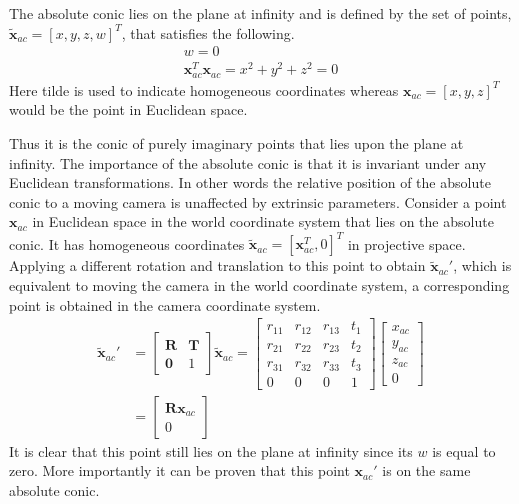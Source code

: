 The absolute conic lies on the plane at infinity and is defined by the set of points, $\tilde{\bm{x}}_{ac} = [x, y, z, w]^T$, that satisfies the following. 
\begin{align}
	w = 0 \\
	\bm{x}_{ac}^T \bm{x}_{ac}=x^2 + y^2 + z^2 = 0 
	\label{eq:conditions of absolute conic}
\end{align}
Here tilde is used to indicate homogeneous coordinates whereas $\bm{x}_{ac} = [x, y, z]^T$ would be the point in Euclidean space.

Thus it is the conic of purely imaginary points that lies upon the plane at infinity. The importance of the absolute conic is that it is invariant under any Euclidean transformations. In other words the relative position of the absolute conic to a moving camera is unaffected by extrinsic parameters. Consider a point $\bm{x}_{ac}$ in Euclidean space in the world coordinate system that lies on the absolute conic. It has homogeneous coordinates $\tilde{\bm{x}}_{ac}=[\bm{x}_{ac}^T, 0]^T$ in projective space. Applying a different rotation and translation to this point to obtain $\tilde{\bm{x}}_{ac}'$, which is equivalent to moving the camera in the world coordinate system, a corresponding point is obtained in the camera coordinate system.
\begin{align}
	\tilde{\bm{x}}_{ac}' &=
	\begin{bmatrix}
	\bm{R} & \bm{T} \\
	\bm{0} & 1
	\end{bmatrix}
	\tilde{\bm{x}}_{ac} =
	\begin{bmatrix}
	r_{11} & r_{12} & r_{13} & t_1 \\
	r_{21} & r_{22} & r_{23} & t_2 \\
	r_{31} & r_{32} & r_{33} & t_3 \\
	0 & 0 & 0 & 1
	\end{bmatrix}
	\begin{bmatrix}
	x_{ac} \\
	y_{ac} \\
	z_{ac} \\
	0
	\end{bmatrix} \\
	&= 
	\begin{bmatrix}
	\bm{R} \bm{x}_{ac} \\
	0
	\end{bmatrix}
\end{align}
It is clear that this point still lies on the plane at infinity since its $w$ is equal to zero. More importantly it can be proven that this point $\bm{x}_{ac}'$ is on the same absolute conic.
